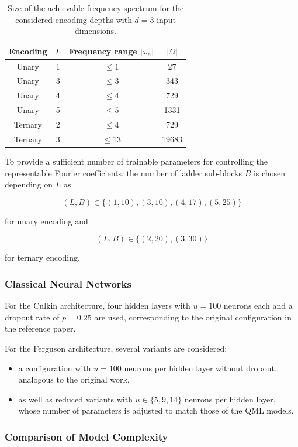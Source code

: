 \begin{table}[htbp]
\centering
\begin{tabular}{c c c c}
\hline
Encoding & $L$ & Frequency range $|\omega_n|$ & $|\Omega|$ \\
\hline
Unary   & 1 & $\le 1$  & 27   \\
Unary   & 3 & $\le 3$  & 343  \\
Unary   & 4 & $\le 4$  & 729  \\
Unary   & 5 & $\le 5$  & 1331 \\
\hline
Ternary & 2 & $\le 4$  & 729  \\
Ternary & 3 & $\le 13$ & 19683 \\
\hline
\end{tabular}
\caption{Size of the achievable frequency spectrum for the considered
encoding depths with $d=3$ input dimensions.}
\label{tab:frequency-spectra}
\end{table}

To provide a sufficient number of trainable parameters for controlling
the representable Fourier coefficients,
the number of ladder sub-blocks $B$ is chosen depending on $L$ as

\[
(L,B) \in \{(1,10), (3,10), (4,17), (5,25)\}
\]

for unary encoding and

\[
(L,B) \in \{(2,20), (3,30)\}
\]

for ternary encoding.

\subsubsection{Classical Neural Networks}

For the Culkin architecture, four hidden layers
with $u=100$ neurons each and a dropout rate
of $p=0.25$ are used, corresponding to the
original configuration in the reference paper.

For the Ferguson architecture, several
variants are considered:
\begin{itemize}
    \item a configuration with $u=100$ neurons
    per hidden layer without dropout,
    analogous to the original work,
    \item as well as reduced variants with
    $u \in \{5,9,14\}$ neurons per hidden layer,
    whose number of parameters is adjusted
    to match those of the QML models.
\end{itemize}

\subsubsection{Comparison of Model Complexity}


